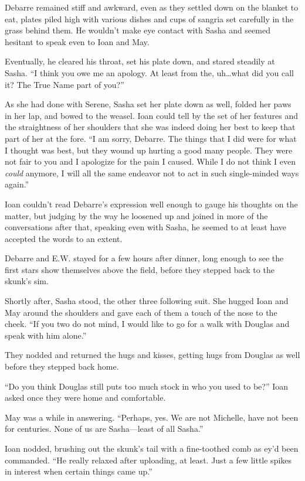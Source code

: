 Debarre remained stiff and awkward, even as they settled down on the blanket to eat, plates piled high with various dishes and cups of sangria set carefully in the grass behind them. He wouldn't make eye contact with Sasha and seemed hesitant to speak even to Ioan and May.

Eventually, he cleared his throat, set his plate down, and stared steadily at Sasha. ``I think you owe me an apology. At least from the, uh\ldots what did you call it? The True Name part of you?''

As she had done with Serene, Sasha set her plate down as well, folded her paws in her lap, and bowed to the weasel. Ioan could tell by the set of her features and the straightness of her shoulders that she was indeed doing her best to keep that part of her at the fore. ``I am sorry, Debarre. The things that I did were for what I thought was best, but they wound up hurting a good many people. They were not fair to you and I apologize for the pain I caused. While I do not think I even \emph{could} anymore, I will all the same endeavor not to act in such single-minded ways again.''

Ioan couldn't read Debarre's expression well enough to gauge his thoughts on the matter, but judging by the way he loosened up and joined in more of the conversations after that, speaking even with Sasha, he seemed to at least have accepted the words to an extent.

Debarre and E.W. stayed for a few hours after dinner, long enough to see the first stars show themselves above the field, before they stepped back to the skunk's sim.

Shortly after, Sasha stood, the other three following suit. She hugged Ioan and May around the shoulders and gave each of them a touch of the nose to the cheek. ``If you two do not mind, I would like to go for a walk with Douglas and speak with him alone.''

They nodded and returned the hugs and kisses, getting hugs from Douglas as well before they stepped back home.

``Do you think Douglas still puts too much stock in who you used to be?'' Ioan asked once they were home and comfortable.

May was a while in answering. ``Perhaps, yes. We are not Michelle, have not been for centuries. None of us are Sasha—least of all Sasha.''

Ioan nodded, brushing out the skunk's tail with a fine-toothed comb as ey'd been commanded. ``He really relaxed after uploading, at least. Just a few little spikes in interest when certain things came up.''

